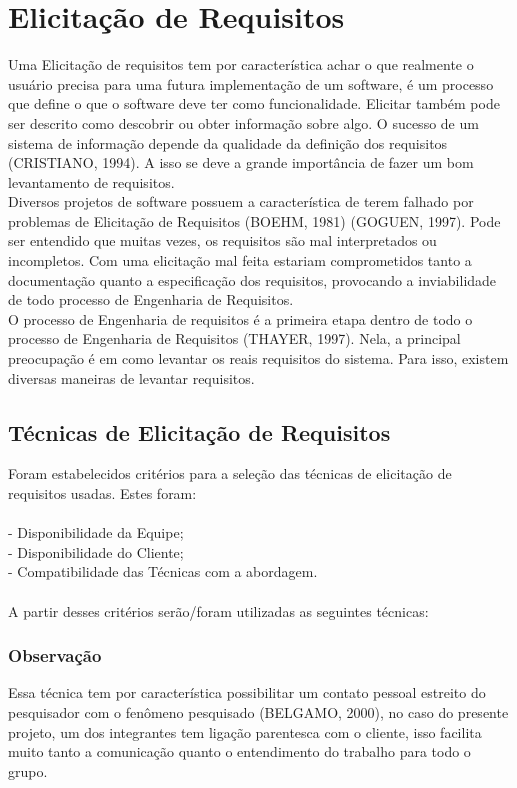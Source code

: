 

\chapter[Elicitação de Requisitos]{Elicitação de Requisitos}

Uma Elicitação de requisitos tem por característica achar o que realmente o usuário precisa para uma futura implementação de um software, é um processo que define o que o software deve ter como funcionalidade. Elicitar também pode ser descrito como descobrir ou obter informação sobre algo. O sucesso de um sistema de informação depende da qualidade da definição dos requisitos (CRISTIANO, 1994). A isso se deve a grande importância de fazer um bom levantamento de requisitos.\\
\tab Diversos projetos de software possuem a característica de terem falhado por problemas de Elicitação de Requisitos (BOEHM, 1981) (GOGUEN, 1997). Pode ser entendido que muitas vezes, os requisitos são mal interpretados ou incompletos. Com uma elicitação mal feita estariam comprometidos tanto a documentação quanto a especificação dos requisitos, provocando a inviabilidade de todo processo de Engenharia de Requisitos.\\
\tab O processo de Engenharia de requisitos é a primeira etapa dentro de todo o processo de Engenharia de Requisitos (THAYER, 1997). Nela, a principal preocupação é em como levantar os reais requisitos do sistema. Para isso, existem diversas maneiras de levantar requisitos. \\

\section{Técnicas de Elicitação de Requisitos}
\tab Foram estabelecidos critérios para a seleção das técnicas de elicitação de requisitos usadas. Estes foram:\\ \\
\tab - Disponibilidade da Equipe;\\
\tab - Disponibilidade do Cliente;\\
\tab - Compatibilidade das Técnicas com a abordagem.\\ \\
\tab A partir desses critérios serão/foram utilizadas as seguintes técnicas:\\

\subsection{Observação}
\tab Essa técnica tem por característica possibilitar um contato pessoal estreito do pesquisador com o fenômeno pesquisado (BELGAMO, 2000), no caso do presente projeto, um dos integrantes tem ligação parentesca com o cliente, isso facilita muito tanto a comunicação quanto o entendimento do trabalho para todo o grupo.\\

